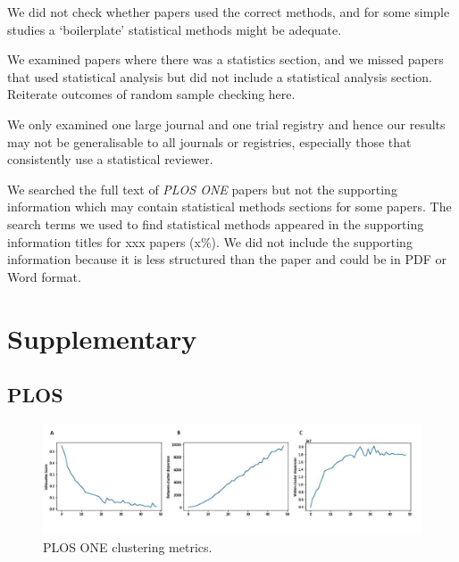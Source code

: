 \documentclass[12pt]{article}
\begin{document}
We did not check whether papers used the correct methods, and for some
simple studies a `boilerplate' statistical methods might be adequate.

We examined papers where there was a statistics section, and we missed
papers that used statistical analysis but did not include a statistical
analysis section. Reiterate outcomes of random sample checking here.

We only examined one large journal and one trial registry and hence our
results may not be generalisable to all journals or registries,
especially those that consistently use a statistical reviewer.

We searched the full text of \emph{PLOS ONE} papers but not the
supporting information which may contain statistical methods sections
for some papers. The search terms we used to find statistical methods
appeared in the supporting information titles for xxx papers (x\%). We
did not include the supporting information because it is less structured
than the paper and could be in PDF or Word format.

\section{Supplementary}

\subsection{PLOS}

\begin{figure}

{\centering \includegraphics[width=1\linewidth]{figures/supplementary/supp_plosone.50clusters} 

}

\caption{PLOS ONE clustering metrics.}\label{fig:unnamed-chunk-11}
\end{figure}
\end{document}
